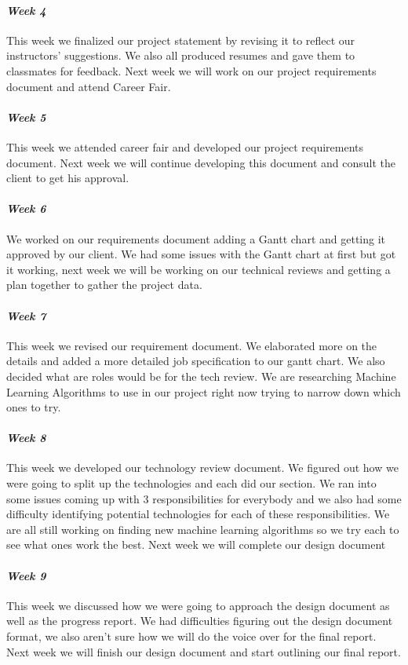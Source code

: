 \documentclass[onecolumn, draftclsnofoot,10pt, compsoc]{IEEEtran}
\begin{document}
\paragraph{\emph{Week 4}}
This week we finalized our project statement by revising it to reflect our instructors' suggestions. We also all produced resumes and gave them to classmates for feedback. Next week we will work on our project requirements document and attend Career Fair.

\paragraph{\emph{Week 5}}
This week we attended career fair and developed our project requirements document. Next week we will continue developing this document and consult the client to get his approval.
\paragraph{\emph{Week 6}}
We worked on our requirements document adding a Gantt chart and getting it approved by our client. We had some issues with the Gantt chart at first but got it working, next week we will be working on our technical reviews and getting a plan together to gather the project data.
\paragraph{\emph{Week 7}}
This week we revised our requirement document. We elaborated more on the details and added a more detailed job specification to our gantt chart. We also decided what are roles would be for the tech review. We are researching Machine Learning Algorithms to use in our project right now trying to narrow down which ones to try.
\paragraph{\emph{Week 8}}
This week we developed our technology review document. We figured out how we were going to split up the technologies and each did our section. We ran into some issues coming up with 3 responsibilities for everybody and we also had some difficulty identifying potential technologies for each of these responsibilities. We are all still working on finding new machine learning algorithms so we try each to see what ones work the best. Next week we will complete our design document
\paragraph{\emph{Week 9}}
This week we discussed how we were going to approach the design document as well as the progress report. We had difficulties figuring out the design document format, we also aren't sure how we will do the voice over for the final report. Next week we will finish our design document and start outlining our final report.
\end{document}
